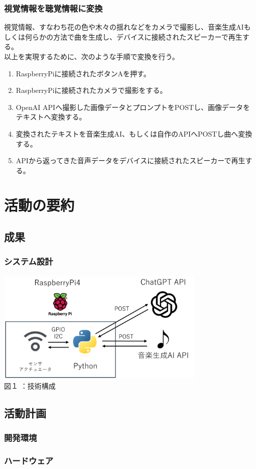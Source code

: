 \documentclass[12pt,a4paper]{report}
\begin{document}
\newpage

\subsection{視覚情報を聴覚情報に変換}
\noindent\space
視覚情報、すなわち花の色や木々の揺れなどをカメラで撮影し、音楽生成AIもしくは何らかの方法で曲を生成し、デバイスに接続されたスピーカーで再生する。\\
以上を実現するために、次のような手順で変換を行う。
\begin{enumerate}
  \item RaspberryPiに接続されたボタンAを押す。
  \item RaspberryPiに接続されたカメラで撮影をする。
  \item OpenAI APIへ撮影した画像データとプロンプトをPOSTし、画像データをテキストへ変換する。
  \item 変換されたテキストを音楽生成AI、もしくは自作のAPIへPOSTし曲へ変換する。
  \item APIから返ってきた音声データをデバイスに接続されたスピーカーで再生する。
\end{enumerate} 

\chapter{活動の要約}
\section{成果}
\noindent\space
\subsection{システム設計}
\begin{center}
  \includegraphics[width=100mm]{images/tech-conf.png}\\
  図１  ：技術構成
\end{center}
\section{活動計画}\noindent
\subsection{開発環境}
\subsection{ハードウェア}
\end{document}
